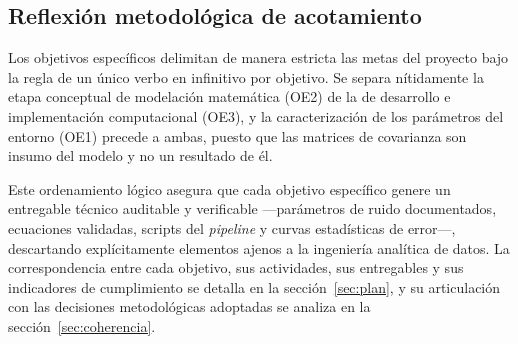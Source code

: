 \subsection{Reflexión metodológica de acotamiento}

Los objetivos específicos delimitan de manera estricta las metas del proyecto
bajo la regla de un único verbo en infinitivo por objetivo. Se separa
nítidamente la etapa conceptual de modelación matemática (OE2) de la de
desarrollo e implementación computacional (OE3), y la caracterización de los
parámetros del entorno (OE1) precede a ambas, puesto que las matrices de
covarianza son insumo del modelo y no un resultado de él.

Este ordenamiento lógico asegura que cada objetivo específico genere un
entregable técnico auditable y verificable —parámetros de ruido documentados,
ecuaciones validadas, scripts del \emph{pipeline} y curvas estadísticas de
error—, descartando explícitamente elementos ajenos a la ingeniería analítica de
datos. La correspondencia entre cada objetivo, sus actividades, sus entregables
y sus indicadores de cumplimiento se detalla en la sección~\ref{sec:plan}, y su
articulación con las decisiones metodológicas adoptadas se analiza en la
sección~\ref{sec:coherencia}.
